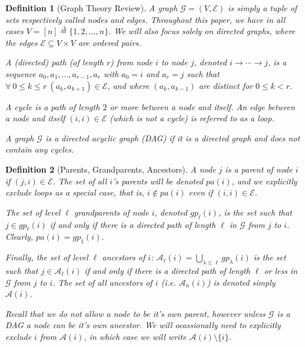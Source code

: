 \documentclass{statsoc}
\def\gcg{\mathcal{G}}  %
\def\gcge{\mathcal{E}}  %
\newcommand{\pa}[1]{pa(#1)}  %
\newcommand{\anc}[1]{\mathcal{A}(#1)}  %
\newcommand{\ancn}[2]{\mathcal{A}_{#1}(#2)}  %
\newcommand{\gpn}[2]{gp_{#1}(#2)}  %
\newcommand{\gcgpath}[2]{#1 \rightarrow \cdots \rightarrow #2}  %
\newtheorem{definition}{Definition}
\def\defeq{\overset{\Delta}{=}}  %
\begin{document}
\begin{definition}[Graph Theory Review]
  A \textit{graph} $\gcg = (V, \gcge)$ is simply a
  tuple of sets respectively called \textit{nodes} and \textit{edges}.
  Throughout this paper, we have in all cases
  $V = [n] \defeq \{1, 2, \ldots, n\}$.  We will also focus solely on
  \textit{directed} graphs, where the edges
  $\gcge \subseteq V \times V$ are \textit{ordered} pairs.

  A (directed) \textit{path} (of length $r$) from node $i$ to node
  $j$, denoted $\gcgpath{i}{j}$, is a sequence
  $a_0, a_1, \ldots, a_{r - 1}, a_r$ with $a_0 = i$ and $a_r = j$ such
  that $\forall\ 0 \le k \le r\ (a_k, a_{k + 1}) \in \gcge$, and where
  $(a_k, a_{k - 1})$ are \textit{distinct} for $0 \le k < r$.

  A \textit{cycle} is a path of length $2$ or more between a node and
  itself.  An edge between a node and itself $(i, i) \in \gcge$ (which
  is not a cycle) is referred to as a \textit{loop}.

  A graph $\gcg$ is a \textit{directed acyclic graph} (DAG) if it is a
  directed graph and does not contain any cycles.
\end{definition}

\begin{definition}[Parents, Grandparents, Ancestors]
  A node $j$ is a \textit{parent} of node $i$ if $(j, i) \in \gcge$.
  The set of all $i$'s parents will be denoted $\pa{i}$, and we
  explicitly exclude loops as a special case, that is,
  $i \not\in \pa{i}$ even if $(i, i) \in \gcge$.

  The set of level $\ell$ \textit{grandparents} of node $i$, denoted
  $\gpn{\ell}{i}$, is the set such that $j \in \gpn{\ell}{i}$ if and
  only if there is a \textit{directed path} of length $\ell$ in $\gcg$
  from $j$ to $i$.  Clearly, $\pa{i} = \gpn{1}{i}$.

  Finally, the set of \textit{level $\ell$ ancestors} of $i$:
  $\ancn{\ell}{i} = \bigcup_{\lambda \le \ell}\gpn{\lambda}{i}$ is the
  set such that $j \in \ancn{\ell}{i}$ if and only if there is a
  directed path of length $\ell$ \textit{or less} in $\gcg$ from $j$
  to $i$.  The set of \textit{all ancestors} of $i$
  (i.e. $\ancn{n}{i}$) is denoted simply $\anc{i}$.

  Recall that we do not allow a node to be it's own parent, however
  unless $\gcg$ is a DAG a node \textit{can} be it's own ancestor.  We will
  ocassionally need to explicitly exclude $i$ from $\anc{i}$, in which
  case we will write $\anc{i}\setminus \{i\}$.
\end{definition}
\end{document}
